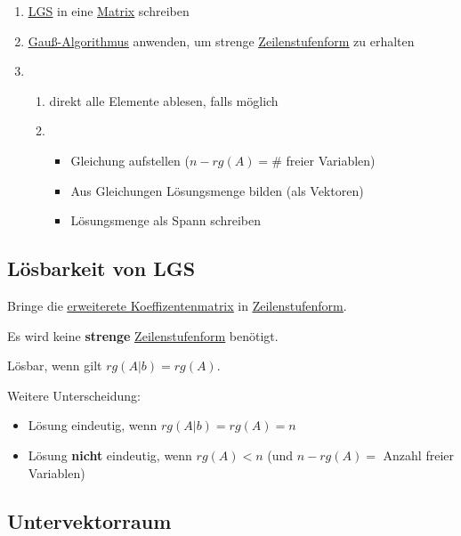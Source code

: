 \documentclass{scrartcl}
\newcommand{\linkTo}[1]{\hyperref[#1]{\underline{#1}}}
\newcommand{\linkToRef}[2][ref]{\hyperref[#1]{\underline{#2}}}
\begin{document}
\begin{enumerate}
\item \linkTo{LGS} in eine \linkTo{Matrix} schreiben
\item \linkToRef[Gauss]{Gauß-Algorithmus} anwenden, um strenge \linkTo{Zeilenstufenform} zu erhalten
\item 
    \begin{enumerate}
        \item direkt alle Elemente ablesen, falls möglich
        \item 
            \begin{itemize}
            \item Gleichung aufstellen ($n-rg(A) = \#$ freier Variablen)
            \item Aus Gleichungen Lösungsmenge bilden (als Vektoren)
            \item Lösungsmenge als Spann schreiben
            \end{itemize}
    \end{enumerate}
\end{enumerate}

\subsection{Lösbarkeit von LGS}

Bringe die \linkTo{erweiterete Koeffizentenmatrix} in \linkTo{Zeilenstufenform}. 

Es wird keine \textbf{strenge} \linkTo{Zeilenstufenform} benötigt.

Lösbar, wenn gilt \linkToRef[Rang]{$rg(A|b) = rg(A)$}.

Weitere Unterscheidung:
\begin{itemize}
\item Lösung eindeutig, wenn $ rg(A|b) = rg(A) = n$
\item Lösung \textbf{nicht} eindeutig, wenn $rg(A) < n$ (und $n - rg(A) = $ Anzahl freier Variablen)
\end{itemize}

\subsection{Untervektorraum}
\end{document}
